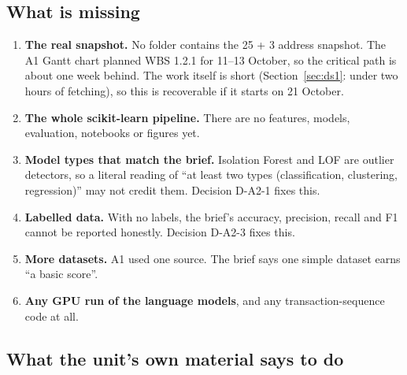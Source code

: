 \subsection{What is missing}

\begin{enumerate}
  \item \textbf{The real snapshot.} No folder contains the 25 + 3 address snapshot. The A1 Gantt
    chart planned WBS 1.2.1 for 11--13 October, so the critical path is about one week behind.
    The work itself is short (Section~\ref{sec:ds1}: under two hours of fetching), so this is
    recoverable if it starts on 21 October.
  \item \textbf{The whole scikit-learn pipeline.} There are no features, models, evaluation,
    notebooks or figures yet.
  \item \textbf{Model types that match the brief.} Isolation Forest and LOF are outlier
    detectors, so a literal reading of ``at least two types (classification, clustering,
    regression)'' may not credit them. Decision D-A2-1 fixes this.
  \item \textbf{Labelled data.} With no labels, the brief's accuracy, precision, recall and F1
    cannot be reported honestly. Decision D-A2-3 fixes this.
  \item \textbf{More datasets.} A1 used one source. The brief says one simple dataset earns ``a
    basic score''.
  \item \textbf{Any GPU run of the language models}, and any transaction-sequence code at all.
\end{enumerate}

\subsection{What the unit's own material says to do}


